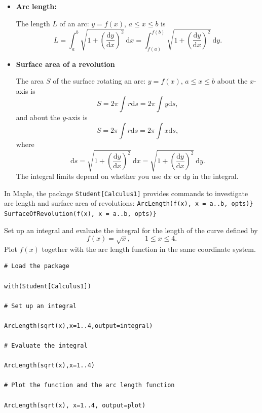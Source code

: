\documentclass[]{book}
\theoremstyle{definition}
\theoremstyle{definition}
\theoremstyle{definition}
\theoremstyle{remark}
\let\BeginKnitrBlock\begin \let\EndKnitrBlock\end
\begin{document}
\begin{itemize}
\item
  \textbf{Arc length:}

  The length \(L\) of an arc: \(y=f(x)\), \(a\leq x \leq b\) is
  \[
  L=\int_a^b\sqrt{1+\left(\frac{\mathrm{d} y}{\mathrm{d} x}\right)^2}~\mathrm{d} x=\int_{f(a)}^{f(b)}\sqrt{1+\left(\frac{\mathrm{d} y}{\mathrm{d} x}\right)^2}~\mathrm{d} y.
  \]
\item
  \textbf{Surface area of a revolution}

  The area \(S\) of the surface rotating an arc: \(y=f(x)\), \(a\leq x \leq b\) about the \(x\)-axis is
  \[
  S=2\pi\int r\mathrm{d} s = 2\pi\int y\mathrm{d} s,
  \]
  and about the \(y\)-axis is
  \[
  S=2\pi\int r\mathrm{d} s = 2\pi\int x\mathrm{d} s,
  \]
  where
  \[\mathrm{d} s=\sqrt{1+\left(\frac{\mathrm{d} y}{\mathrm{d} x}\right)^2}~\mathrm{d} x = \sqrt{1+\left(\frac{\mathrm{d} y}{\mathrm{d} x}\right)^2}~\mathrm{d} y.
  \]
  The integral limits depend on whether you use \(\mathrm{d} x\) or \(\mathrm{d}y\) in the integral.
\end{itemize}

In Maple, the package \texttt{Student{[}Calculus1{]}} provides commands to investigate arc length and surface area of revolutions:
\texttt{ArcLength(f(x),\ x\ =\ a..b,\ opts)\}}
\texttt{SurfaceOfRevolution(f(x),\ x\ =\ a..b,\ opts)\}}

\BeginKnitrBlock{example}
\protect\hypertarget{exm:unnamed-chunk-1}{}{\label{exm:unnamed-chunk-1} }
Set up an integral and evaluate the integral for the length of the curve defined by
\[
f(x)=\sqrt{x},\qquad 1\leq x\leq 4.
\]
Plot \(f(x)\) together with the arc length function in the same coordinate system.
\EndKnitrBlock{example}

\BeginKnitrBlock{solution}
{}

\begin{verbatim}
# Load the package

with(Student[Calculus1])

# Set up an integral

ArcLength(sqrt(x),x=1..4,output=integral)

# Evaluate the integral

ArcLength(sqrt(x),x=1..4)

# Plot the function and the arc length function

ArcLength(sqrt(x), x=1..4, output=plot)
\end{verbatim}
\EndKnitrBlock{solution}
\end{document}

